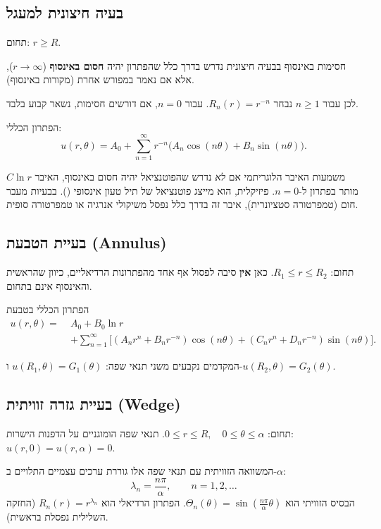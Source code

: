 \subsection{בעיה חיצונית למעגל}
תחום: \(r\ge R\).

\begin{notebox}{חסימות באינסוף}
בבעיה חיצונית נדרש בדרך כלל שהפתרון יהיה \textbf{חסום באינסוף} (\(r\to\infty\)),
אלא אם נאמר במפורש אחרת (מקורות באינסוף).
\end{notebox}

לכן עבור \(n\ge1\) נבחר \(R_n(r)=r^{-n}\). עבור \(n=0\), אם דורשים חסימות, נשאר קבוע בלבד.

הפתרון הכללי:
\[
u(r,\theta)=
A_0
+\sum_{n=1}^\infty
r^{-n}\bigl(
A_n\cos(n\theta)+B_n\sin(n\theta)
\bigr).
\]

\begin{physicsnote}{משמעות האיבר הלוגריתמי}
אם \emph{לא} נדרש שהפוטנציאל יהיה חסום באינסוף, האיבר \(C\ln r\) מותר בפתרון ל-\(n=0\). פיזיקלית, הוא מייצג פוטנציאל של תיל טעון אינסופי (). בבעיות מעבר חום (טמפרטורה סטציונרית), איבר זה בדרך כלל נפסל משיקולי אנרגיה או טמפרטורה סופית.
\end{physicsnote}

\subsection{בעיית הטבעת (Annulus)}
תחום: \(R_1\le r\le R_2\).
כאן \textbf{אין} סיבה לפסול אף אחד מהפתרונות הרדיאליים, כיוון שהראשית והאינסוף אינם בתחום.

\begin{resultbox}{הפתרון הכללי בטבעת}
\[
\begin{aligned}
u(r,\theta)=\;&
A_0 + B_0\ln r \\
&+ \sum_{n=1}^\infty
\Big[
(A_n r^n + B_n r^{-n})\cos(n\theta)
+ (C_n r^n + D_n r^{-n})\sin(n\theta)
\Big].
\end{aligned}
\]
\end{resultbox}

המקדמים נקבעים משני תנאי שפה: \(u(R_1,\theta)=G_1(\theta)\) ו-\(u(R_2,\theta)=G_2(\theta)\).

\subsection{בעיית גזרה זוויתית (Wedge)}
תחום: \(0\le r\le R,\quad 0\le\theta\le\alpha\).
תנאי שפה הומוגניים על הדפנות הישרות: \(u(r,0)=u(r,\alpha)=0\).

המשוואה הזוויתית עם תנאי שפה אלו גוררת ערכים עצמיים התלויים ב-\(\alpha\):
\[
\lambda_n=\frac{n\pi}{\alpha},
\qquad n=1,2,\dots
\]
הבסיס הזוויתי הוא \(\Theta_n(\theta)=\sin\!\left(\frac{n\pi}{\alpha}\theta\right)\).
הפתרון הרדיאלי הוא \(R_n(r)=r^{\lambda_n}\) (החזקה השלילית נפסלת בראשית).

